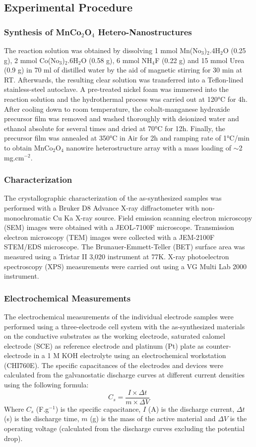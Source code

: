 \documentclass[reprint,amsmath,amssymb,aps,floatfix,
]{revtex4-2}
\begin{document}
\subsection{\label{sec:level3}Experimental Procedure}
\subsubsection{Synthesis of MnCo$_2$O$_4$ Hetero-Nanostructures}
The reaction solution was obtained by dissolving 1 mmol Mn(No$_3$)$_2$.4H$_2$O (0.25 g), 2 mmol Co(No$_3$)$_2$.6H$_2$O (0.58 g), 6 mmol NH$_4$F (0.22 g) and 15 mmol Urea (0.9 g) in 70 ml of distilled water by the aid of magnetic stirring for 30 min at RT. Afterwards, the resulting clear solution was transferred into a Teflon-lined stainless-steel autoclave. A pre-treated nickel foam was immersed into the reaction solution and the hydrothermal process was carried out at \ang{120}C for 4h. After cooling down to room temperature, the cobalt-manganese hydroxide precursor film was removed and washed thoroughly with deionized water and ethanol absolute for several times and dried at \ang{70}C for 12h. Finally, the precursor film was annealed at \ang{350}C in Air for 2h and ramping rate of \ang{1}C/min to obtain MnCo$_2$O$_4$ nanowire heterostructure array with a mass loading of $\sim$2 mg.cm$^{-2}$.
\subsubsection{Characterization}
The crystallographic characterization of the as-synthesized samples was performed with a Bruker D8 Advance X-ray diffractometer with non-monochromatic Cu Ka X-ray source. Field emission scanning electron microscopy (SEM) images were obtained with a JEOL-7100F microscope. Transmission electron microscopy (TEM) images were collected with a JEM-2100F STEM/EDS microscope. The Brunauer-Emmett-Teller (BET) surface area was measured using a Tristar II 3,020 instrument at 77K. X-ray photoelectron spectroscopy (XPS) measurements were carried out using a VG Multi Lab 2000 instrument.
\subsubsection{Electrochemical Measurements}
The electrochemical measurements of the individual electrode samples were performed using a three-electrode cell system with the as-synthesized materials on the conductive substrates as the working electrode, saturated calomel electrode (SCE) as reference electrode and platinum (Pt) plate as counter-electrode in a 1 M KOH electrolyte using an electrochemical workstation (CHI760E). The specific capacitances of the electrodes and devices were calculated from the galvanostatic discharge curves at different current densities using the following formula:
\begin{equation}C_s = \frac{I \times \Delta t}{m \times \Delta V}\end{equation}
Where $C_s$ (F.g$^{-1}$) is the specific capacitance, $I$ (A) is the discharge current, $\Delta t$ (s) is the discharge time, $m$ (g) is the mass of the active material and $\Delta V$ is the operating voltage (calculated from the discharge curves excluding the potential drop).
\end{document}

